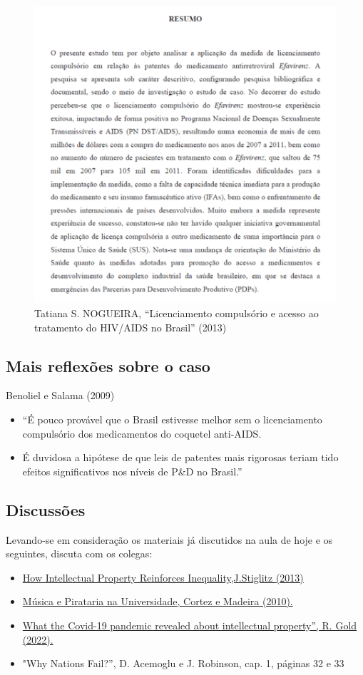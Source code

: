 \documentclass[a4paper,12pt]{article}[abntex2]
\begin{document}
\begin{figure}[H]
    \centering
    \caption{Tatiana S. NOGUEIRA, “Licenciamento compulsório e acesso ao tratamento do HIV/AIDS no Brasil” (2013)}
    \includegraphics[width=0.7\linewidth]{Imagens/a8i4.png}
\end{figure}

\subsection{\textbf{Mais reflexões sobre o caso}}
Benoliel e Salama (2009)\begin{itemize}
    \item “É pouco provável que o Brasil estivesse melhor sem o licenciamento compulsório dos medicamentos do coquetel anti-AIDS.
    \item É duvidosa a hipótese de que leis de patentes mais rigorosas teriam tido efeitos significativos nos níveis de P\&D no Brasil.”
\end{itemize}

\subsection{\textbf{Discussões}}
Levando-se em consideração os materiais já discutidos na aula de hoje e os seguintes, discuta com os colegas:\begin{itemize}
    \item \href{https://archive.nytimes.com/opinionator.blogs.nytimes.com/2013/07/14/how-intellectual-property-reinforces-inequality/}{How Intellectual Property Reinforces Inequality,J.Stiglitz (2013)}
    \item \href{http://www.anpec.org.br/encontro2010/inscricao/arquivos/000-a3b50eba957afcc5a3f2a1895ca6485a.pdf}{Música e Pirataria na Universidade, Cortez e Madeira (2010).}
    \item \href{https://www.nature.com/articles/s41587-022-01485-x}{What the Covid-19 pandemic revealed about intellectual property”, R. Gold (2022).  }
    \item "Why Nations Fail?”, D. Acemoglu e J. Robinson, cap. 1, páginas 32 e 33
\end{itemize}
\end{document}
